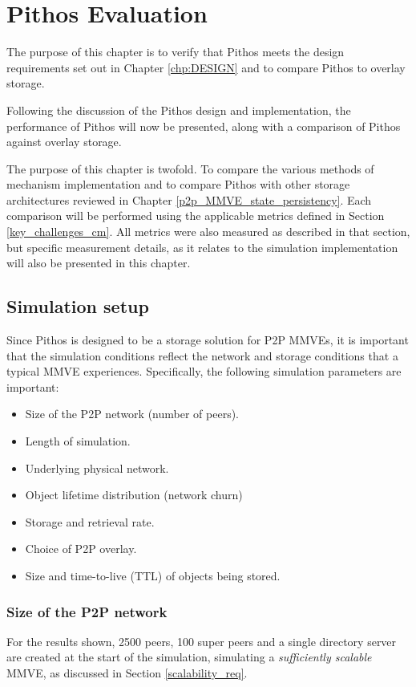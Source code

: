 \chapter{Pithos Evaluation}
\label{chp:EVALUATION}

The purpose of this chapter is to verify that Pithos meets the design requirements set out in Chapter \ref{chp:DESIGN} and to compare Pithos to overlay storage.

Following the discussion of the Pithos design and implementation, the performance of Pithos will now be presented, along with a comparison of Pithos against overlay storage.

The purpose of this chapter is twofold. To compare the various methods of mechanism implementation and to compare Pithos with other storage architectures reviewed in Chapter \ref{p2p_MMVE_state_persistency}. Each comparison will be performed using the applicable metrics defined in Section \ref{key_challenges_cm}. All metrics were also measured as described in that section, but specific measurement details, as it relates to the simulation implementation will also be presented in this chapter.

\section{Simulation setup}
\label{simulation_setup}

Since Pithos is designed to be a storage solution for P2P MMVEs, it is important that the simulation conditions reflect the network and storage conditions that a typical MMVE experiences. Specifically, the following simulation parameters are important:
%
\begin{itemize}
\item Size of the P2P network (number of peers).
\item Length of simulation.
\item Underlying physical network.
\item Object lifetime distribution (network churn)
\item Storage and retrieval rate.
\item Choice of P2P overlay.
\item Size and time-to-live (TTL) of objects being stored.
\end{itemize}

\subsection{Size of the P2P network}
For the results shown, 2500 peers, 100 super peers and a single directory server are created at the start of the simulation, simulating a \emph{sufficiently scalable} MMVE, as discussed in Section \ref{scalability_req}.


